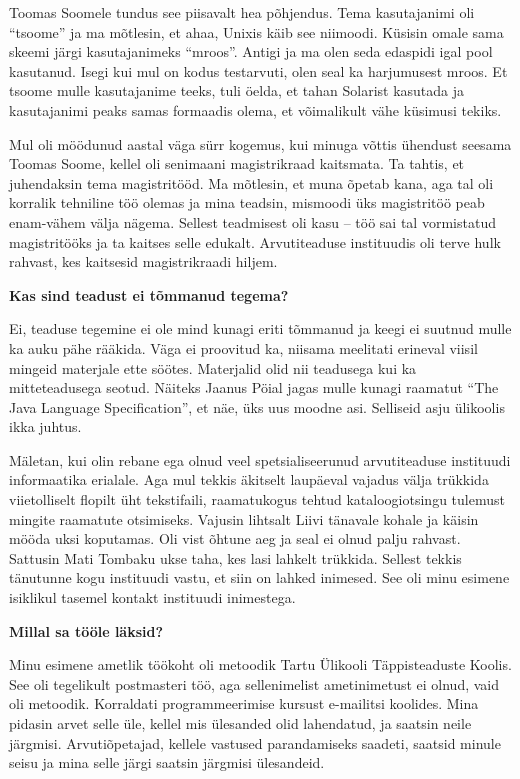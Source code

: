 Toomas Soomele tundus see piisavalt hea põhjendus.
Tema kasutajanimi oli \enquote{tsoome} ja ma mõtlesin, et ahaa,
Unixis käib see niimoodi. Küsisin omale sama skeemi järgi
kasutajanimeks \enquote{mroos}. Antigi ja ma olen seda edaspidi
igal pool kasutanud. Isegi kui mul on kodus testarvuti, olen seal ka
harjumusest mroos. Et tsoome mulle kasutajanime teeks, tuli öelda, et tahan
Solarist kasutada ja kasutajanimi peaks samas formaadis olema, et
võimalikult vähe küsimusi tekiks.

Mul oli möödunud aastal
väga sürr kogemus, kui minuga võttis ühendust seesama Toomas Soome, kellel
oli senimaani magistrikraad kaitsmata. Ta tahtis, et juhendaksin tema
magistritööd. Ma mõtlesin, et muna õpetab kana, aga tal
oli korralik tehniline töö olemas ja mina teadsin, mismoodi üks magistritöö
peab enam-vähem välja nägema. Sellest teadmisest oli kasu -- töö sai tal
vormistatud magistritööks ja ta kaitses selle edukalt. Arvutiteaduse instituudis oli terve hulk rahvast,
kes kaitsesid magistrikraadi hiljem.

\textbf{Kas sind teadust ei tõmmanud tegema?}

Ei, teaduse tegemine ei ole mind kunagi eriti tõmmanud ja keegi ei suutnud
mulle ka auku pähe rääkida. Väga ei proovitud ka, niisama meelitati
erineval viisil mingeid materjale ette söötes. Materjalid olid nii
teadusega kui ka mitteteadusega seotud. Näiteks Jaanus Pöial jagas mulle kunagi raamatut \enquote{The Java Language Specification},
et näe, üks uus moodne asi. Selliseid asju ülikoolis ikka juhtus.

Mäletan, kui olin rebane ega olnud veel spetsialiseerunud arvutiteaduse
instituudi informaatika erialale. Aga mul tekkis äkitselt laupäeval vajadus välja trükkida
viietolliselt flopilt üht tekstifaili, raamatukogus tehtud kataloogiotsingu tulemust mingite raamatute otsimiseks. Vajusin lihtsalt Liivi tänavale kohale ja
käisin mööda uksi koputamas. Oli vist õhtune aeg ja seal
ei olnud palju rahvast. Sattusin Mati Tombaku ukse
taha, kes lasi lahkelt trükkida. Sellest tekkis tänutunne kogu
instituudi vastu, et siin on lahked inimesed. See oli minu esimene
isiklikul tasemel kontakt instituudi inimestega.

\textbf{Millal sa tööle läksid?} 	

Minu esimene ametlik töökoht oli metoodik Tartu Ülikooli Täppisteaduste
Koolis. See oli tegelikult
postmasteri töö, aga sellenimelist ametinimetust ei olnud, vaid oli metoodik.
Korraldati programmeerimise kursust e-mailitsi koolides. Mina
pidasin arvet selle üle, kellel mis ülesanded olid lahendatud, ja saatsin neile
järgmisi. Arvutiõpetajad, kellele vastused parandamiseks saadeti,
saatsid minule seisu ja mina selle järgi saatsin järgmisi ülesandeid. 

